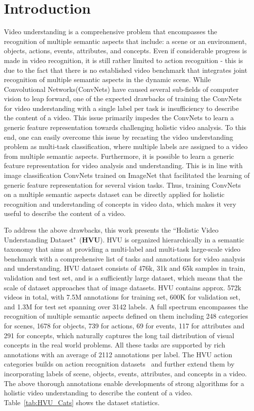 \documentclass[runningheads]{llncs}
\begin{document}
\section{Introduction}

Video understanding is a comprehensive problem that encompasses the recognition of multiple semantic aspects that include: a scene or an environment, objects, actions, events, attributes, and concepts. Even if considerable progress is made in video recognition, it is still rather limited to action recognition - this is due to the fact that there is no established video benchmark that integrates joint recognition of multiple semantic aspects in the dynamic scene. While Convolutional Networks(ConvNets) have caused several sub-fields of computer vision to leap forward, one of the expected drawbacks of training the ConvNets for video understanding  with a single label per task is insufficiency to describe  the content of a video.
This issue primarily impedes the ConvNets to learn a generic feature representation towards challenging holistic video analysis. To this end, one can easily overcome this issue by recasting the video understanding problem as multi-task classification, where multiple labels are assigned to a video from multiple semantic aspects.
Furthermore, it is possible to learn a generic feature representation for video analysis and understanding. This is in line with 
image classification ConvNets trained on ImageNet that facilitated the learning of generic feature representation for several vision tasks. Thus, training ConvNets on a multiple semantic aspects dataset can be directly applied for  holistic recognition and understanding of concepts in video data, which makes it very useful to describe  the content of a video.


To address the above drawbacks, this work presents the ``Holistic Video Understanding Dataset"~(\textbf{HVU}). HVU is organized hierarchically in a semantic taxonomy that aims at providing a multi-label and multi-task large-scale video benchmark with a comprehensive list of tasks and annotations for video analysis and understanding. HVU dataset consists of 476k, 31k and 65k samples in train, validation and test set, and is a sufficiently large dataset, which means that the scale of  dataset approaches that of image datasets.
HVU  contains approx. 572k videos in total, with 7.5M annotations for training set, 600K for validation set, and 1.3M for test set spanning over 3142 labels. A full spectrum encompasses the recognition of multiple semantic aspects defined on them including  248 categories for scenes, 1678 for objects, 739 for actions, 69 for events, 117 for attributes and 291 for concepts, which naturally captures the long tail distribution of visual concepts in the real world problems. All these tasks are supported by rich annotations with an average of 2112 annotations per label. The HVU action categories builds on action recognition datasets~\cite{ava,kinetics,hmdb51,ucf101,hacs} and further extend them by incorporating labels of scene,  objects, events, attributes, and concepts in a video. The above thorough annotations enable developments of strong algorithms for a holistic video understanding to describe the content of a video. Table~\ref{tab:HVU_Cats} shows the dataset statistics.
\end{document}
